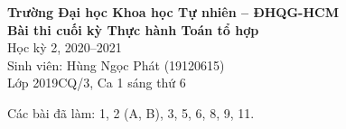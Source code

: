 \documentclass[12pt]{article}
\begin{document}
\begin{center}
    \large{\bfseries Trường Đại học Khoa học Tự nhiên -- ĐHQG-HCM}\\
    \LARGE{\bfseries Bài thi cuối kỳ Thực hành Toán tổ hợp} \\
    \Large{Học kỳ 2, 2020--2021}\\
    \large{Sinh viên: Hùng Ngọc Phát (19120615)}\\
    \large{Lớp 2019CQ/3, Ca 1 sáng thứ 6}\\[1.5cm]
\end{center}

Các bài đã làm: 1, 2 (A, B), 3, 5, 6, 8, 9, 11.

\newpage
\newpage
\newpage
\newpage
\newpage
\newpage
\newpage

\renewcommand{\bibname}{Tài liệu tham khảo}


\end{document}
